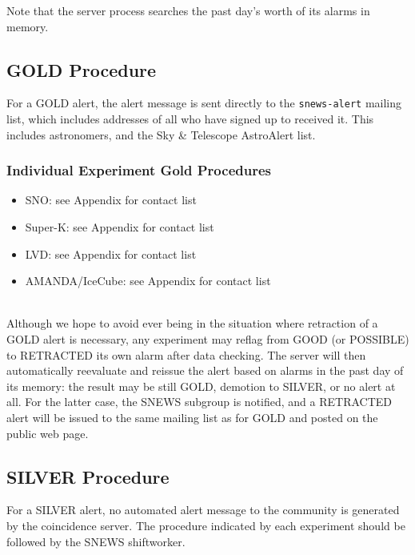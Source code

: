 \documentclass{article}
\begin{document}
Note that the server process searches the past day's worth of its
alarms in memory.  


\subsection{GOLD Procedure}\label{GOLD}

For a GOLD alert, the alert message is sent directly to the 
{\tt snews-alert} mailing list, which includes addresses of all
who have signed up to received it. This includes astronomers,
and the Sky \& Telescope AstroAlert list. 

\subsubsection{Individual Experiment Gold Procedures}

\begin{itemize}

\item SNO: see Appendix for contact list
\item Super-K: see Appendix for contact list
\item LVD: see Appendix for contact list
\item AMANDA/IceCube: see Appendix for contact list

\end{itemize}


\\ Although we hope
to avoid ever being in the situation where retraction of a GOLD alert
is necessary, any experiment may reflag from GOOD (or POSSIBLE) to RETRACTED its
own alarm after data checking.  The server will then automatically
reevaluate and reissue the alert based on alarms in the past day of its
memory: the result may be still GOLD, demotion to SILVER, or no alert
at all.  For the latter case, the SNEWS subgroup is 
notified, and a RETRACTED alert will be issued to the
same mailing list as for GOLD and posted on the public web page.

\subsection{SILVER Procedure}\label{SILVER}
For a SILVER alert, no automated alert message to the community
is generated by the coincidence server. 
The procedure indicated by each experiment should be followed by
the SNEWS shiftworker.\\
\end{document}
